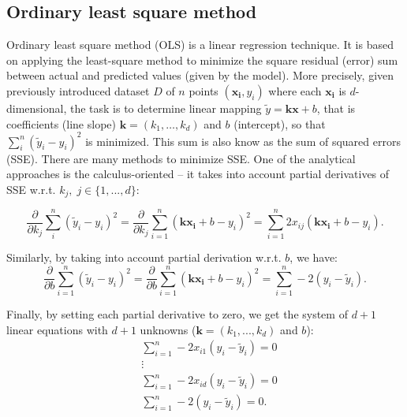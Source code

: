 \documentclass[a4paper,12pt]{elsarticle}
\begin{document}
	\subsection{Ordinary least square method}\label{sec:ols}
	Ordinary least square method (OLS) is a linear regression technique. It is based on applying the least-square method to minimize the square residual (error) sum  between actual and predicted values (given by the model). More precisely, given previously introduced dataset $D$ of $n$ points $(\mathbf{x_i}, y_i)$ where each $\mathbf{x_i}$ is $d$-dimensional, the task is to determine linear mapping $\tilde{y} = \mathbf{k} \mathbf{x} + b$, that is coefficients (line slope) $\mathbf{k} = (k_1, \ldots, k_d)$ and $b$ (intercept), so that $ \sum_{i}^{n} (\tilde{y}_i - y_i)^2 $ is minimized. This sum is also know as the sum of squared errors (SSE). There are many methods to minimize SSE. One of the analytical approaches is the calculus-oriented -- it takes into account partial derivatives of SSE w.r.t. $k_j,\; j \in \{1, ..., d\}$: 
	
	$$  \frac{\partial}{\partial k_j} \sum_{i}^{n} (\tilde{y}_i - y_i)^2 = \frac{\partial}{\partial k_j} \sum_{i=1}^{n} ( \mathbf{k}\mathbf{x_i}+b  - y_i)^2 =  \sum_{i=1}^{n} 2x_{ij}(\mathbf{k}\mathbf{x_i} + b - y_i).$$ 
  
	Similarly, by taking into account  partial derivation w.r.t. $b$, we have: 
	$$  \frac{\partial}{\partial b} \sum_{i=1}^{n} (\tilde{y}_i - y_i)^2  = \frac{\partial}{\partial b} \sum_{i=1}^{n} ( \mathbf{k}\mathbf{x_i}+b  - y_i)^2 = \sum_{i=1}^{n} -2  (y_i - \tilde{y}_i). $$
	
	Finally, by setting each partial derivative to zero, we get the system of $d+1$ linear equations with $d+1$ unknowns ($\mathbf{k}=(k_1, ..., k_d)$ and $b$): 
	\begin{align*}
		& \sum_{i=1}^{n} -2x_{i1} (y_i - \tilde{y}_i) = 0 \\
		& \vdots \\
		& \sum_{i=1}^{n} -2x_{id} (y_i - \tilde{y}_i) = 0 \\
		&\sum_{i=1}^{n} -2  (y_i - \tilde{y}_i) = 0.
	\end{align*}
\end{document}
